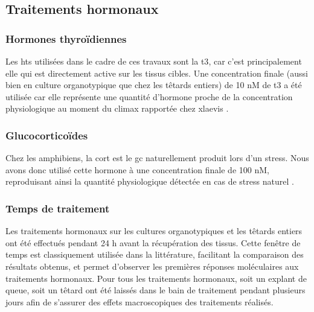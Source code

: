 \documentclass[../main.tex]{subfiles}
\begin{document}

\subsection{Traitements hormonaux}

\subsubsection{Hormones thyroïdiennes}
Les \glspl{ht} utilisées dans le cadre de ces travaux sont la \gls{t3}, car c'est principalement elle qui est directement active sur les tissus cibles.
Une concentration finale (aussi bien en culture organotypique que chez les têtards entiers) de 10 nM de \gls{t3} a été utilisée car elle représente une quantité d'hormone proche de la concentration physiologique au moment du climax rapportée chez \gls{xlaevis} \citep{Leloup1977}.

\subsubsection{Glucocorticoïdes}
Chez les amphibiens, la \gls{cort} est le \gls{gc} naturellement produit lors d'un stress.
Nous avons donc utilisé cette hormone à une concentration finale de 100 nM, reproduisant ainsi la quantité physiologique détectée en cas de stress naturel \citep{JolivetJaudet1984,Krain2004}.

\subsubsection{Temps de traitement}
Les traitements hormonaux sur les cultures organotypiques et les têtards entiers ont été effectués pendant 24 h avant la récupération des tissus.
Cette fenêtre de temps est classiquement utilisée dans la littérature, facilitant la comparaison des résultats obtenus, et permet d'observer les premières réponses moléculaires aux traitements hormonaux.
Pour tous les traitements hormonaux, soit un explant de queue, soit un têtard ont été laissés dans le bain de traitement pendant plusieurs jours afin de s'assurer des effets macroscopiques des traitements réalisés.
\end{document}
